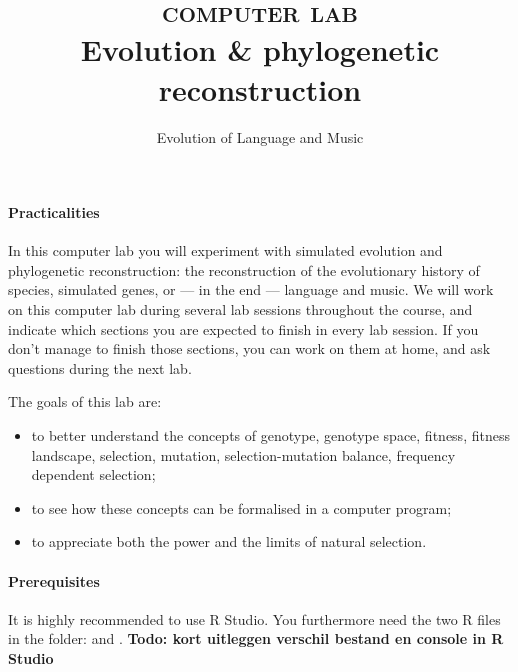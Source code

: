 \documentclass[a4paper, 9pt]{article}
\title{\textsc{computer lab}\\ \textbf{Evolution \& phylogenetic reconstruction}}
\author{Evolution of Language and Music}
\date{}
\begin{document}
\maketitle
{}


\paragraph{Practicalities}
In this computer lab you will experiment with simulated evolution and phylogenetic reconstruction: the reconstruction of the evolutionary history of species, simulated genes, or --- in the end --- language and music. 
We will work on this computer lab during several lab sessions throughout the course, and indicate which sections you are expected to finish in every lab session.
If you don't manage to finish those sections, you can work on them at home, and ask questions during the next lab.

\begin{goals}
The goals of
this lab are:
\begin{itemize}
\item to better understand the concepts of genotype, genotype space, fitness, fitness landscape, selection, mutation, selection-mutation balance, frequency dependent selection;
\item to see how these concepts can be formalised in a computer program;
\item to appreciate both the power and the limits of natural selection.
\end{itemize}
\end{goals}

\paragraph{Prerequisites}
It is highly recommended to use R Studio. You furthermore need the two R files in the  folder:  and .
\textbf{Todo: kort uitleggen verschil bestand en console in R Studio}
\end{document}
